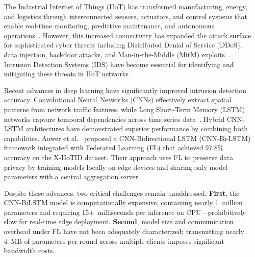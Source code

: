 \documentclass[10pt,journal]{IEEEtran}
\begin{document}
The Industrial Internet of Things (IIoT) has transformed manufacturing, energy, and logistics through interconnected sensors, actuators, and control systems that enable real-time monitoring, predictive maintenance, and autonomous operations~\cite{xu2014survey,boyes2018framework}. However, this increased connectivity has expanded the attack surface for sophisticated cyber threats including Distributed Denial of Service (DDoS), data injection, backdoor attacks, and Man-in-the-Middle (MitM) exploits~\cite{hassanzadeh2020review,zolanvari2019machine}. Intrusion Detection Systems (IDS) have become essential for identifying and mitigating these threats in IIoT networks.

Recent advances in deep learning have significantly improved intrusion detection accuracy. Convolutional Neural Networks (CNNs) effectively extract spatial patterns from network traffic features, while Long Short-Term Memory (LSTM) networks capture temporal dependencies across time series data~\cite{vinayakumar2017cnn,chawla2022hybrid}. Hybrid CNN-LSTM architectures have demonstrated superior performance by combining both capabilities. Anwer et al.~\cite{anwer2025advanced} proposed a CNN-Bidirectional LSTM (CNN-Bi-LSTM) framework integrated with Federated Learning (FL) that achieved 97.8\% accuracy on the X-IIoTID dataset. Their approach uses FL to preserve data privacy by training models locally on edge devices and sharing only model parameters with a central aggregation server.

Despite these advances, two critical challenges remain unaddressed. \textbf{First}, the CNN-BiLSTM model is computationally expensive, containing nearly 1~million parameters and requiring 15+~milliseconds per inference on CPU---prohibitively slow for real-time edge deployment. \textbf{Second}, model size and communication overhead under FL have not been adequately characterized; transmitting nearly 4~MB of parameters per round across multiple clients imposes significant bandwidth costs.
\end{document}
